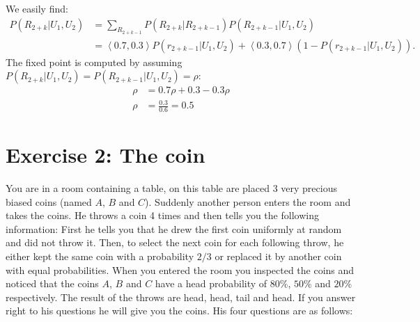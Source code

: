 \documentclass[9pt,a4paper]{extarticle}
\newenvironment{solution}
    {%
    \color{red}
    }
    { 
    \color{black}
    }
\begin{document}
\begin{enumerate}
\begin{solution}
        We easily find:
        \begin{align}
            P(R_{2+k}|U_1, U_2) &= \sum_{R_{2+k-1}}P(R_{2+k}|R_{2+k-1})P(R_{2+k-1}|U_1, U_2)\\
            &=\left<0.7, 0.3\right>P(r_{2+k-1}|U_1, U_2) + \left<0.3, 0.7\right>(1-P(r_{2+k-1}|U_1, U_2)).
        \end{align}
        The fixed point is computed by assuming $P(R_{2+k}|U_1, U_2) = P(R_{2+k-1}|U_1, U_2) = \rho$:
        \begin{align}
            \rho &= 0.7\rho + 0.3 - 0.3\rho\\
            \rho &= \frac{0.3}{0.6} = 0.5
        \end{align}
        \end{solution}
    \end{enumerate}
   \section*{Exercise 2: The coin}
   You are in a room containing a table, on this table are placed 3 very precious biased coins (named $A$, $B$ and $C$). Suddenly another person enters the room and takes the coins. He throws a coin 4 times and then tells you the following information:
    First he tells you that he drew the first coin uniformly at random and did not throw it.
    Then, to select the next coin for each following throw, he either kept the same coin with a probability $2/3$ or  replaced it by another coin with equal probabilities.
   When you entered the room you inspected the coins and noticed that the coins $A$, $B$ and $C$ have a head probability of $80\%$, $50\%$ and $20\%$ respectively. The result of the throws are head, head, tail and head. 
   If you answer right to his questions he will give you the coins. His four questions are as follows:
\end{document}
